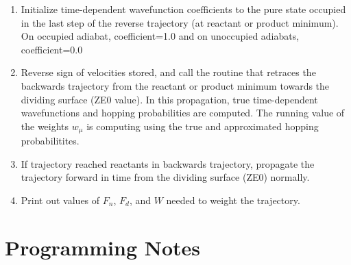 \documentclass[aps,amsfonts,amsmath,amssymb,onecolumn,tightenlines,notitlepage]{revtex4-2}
\begin{document}
\begin{enumerate}
\item Initialize time-dependent wavefunction coefficients to the pure state occupied in the last step of the reverse trajectory (at reactant or product minimum). On occupied adiabat, {\ttfamily coefficient=1.0} and on unoccupied adiabats, {\ttfamily coefficient=0.0}

\item Reverse sign of velocities stored, and call the routine that retraces the backwards trajectory from the reactant or product minimum towards the dividing surface ({\ttfamily ZE0} value).  In this propagation, true time-dependent wavefunctions and hopping probabilities are computed.  The running value of the weights $w_\mu$ is computing using the true and approximated hopping probabilitites. 

\item If trajectory reached reactants in backwards trajectory, propagate the trajectory forward in time from the dividing surface ({\ttfamily ZE0}) normally.

\item Print out values of $F_n$, $F_d$, and $W$ needed to weight the trajectory.

\end{enumerate}

\section{Programming Notes}
\end{document}

